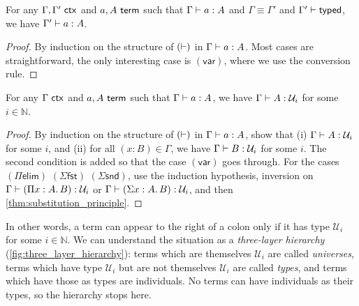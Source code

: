 \documentclass[twoside]{report}
\begin{document}
\begin{proposition}
\label{thm:context_conv}
For any $\Gamma, \Gamma' \ \mathsf{ctx}$ and $a, A \ \mathsf{term}$ such that $\Gamma \vdash a : A$ and $\Gamma \equiv \Gamma'$ and $\Gamma' \vdash \mathsf{typed}$, we have $\Gamma' \vdash a : A$.
\end{proposition}

\begin{proof}
By induction on the structure of $(\vdash)$ in $\Gamma \vdash a : A$. Most cases are straightforward, the only interesting case is $(\mathsf{var})$, where we use the conversion rule.
\end{proof}

\begin{proposition}[Classification]
\label{thm:classification}
For any $\Gamma \ \mathsf{ctx}$ and $a, A \ \mathsf{term}$ such that $\Gamma \vdash a : A$, we have $\Gamma \vdash A : \mathcal U_i$ for some $i \in \mathbb N$.
\end{proposition}

\begin{proof}
By induction on the structure of $(\vdash)$ in $\Gamma \vdash a : A$, show that (i) $\Gamma \vdash A : \mathcal U_i$ for some $i$, and (ii) for all $(x : B) \in \Gamma$, we have $\Gamma \vdash B : \mathcal U_i$ for some $i$. The second condition is added so that the case $(\mathsf{var})$ goes through. For the cases $(\Pi\mathsf{elim})$ $(\Sigma\mathsf{fst})$ $(\Sigma\mathsf{snd})$, use the induction hypothesis, inversion on $\Gamma \vdash (\Pi{x} : {A}.\,{B}) : \mathcal U_i$ or $\Gamma \vdash (\Sigma{x} : {A}.\,{B}) : \mathcal U_i$, and then \cref{thm:substitution_principle}.
\end{proof}

In other words, a term can appear to the right of a colon only if it has type $\mathcal U_i$ for some $i \in \mathbb N$. We can understand the situation as a \emph{three-layer hierarchy} (\cref{fig:three_layer_hierarchy}): terms which are themselves $\mathcal U_i$ are called \emph{universes}, terms which have type $\mathcal U_i$ but are not themselves $\mathcal U_i$ are called \emph{types}, and terms which have those as types are individuals. No terms can have individuals as their types, so the hierarchy stops here.
\end{document}
